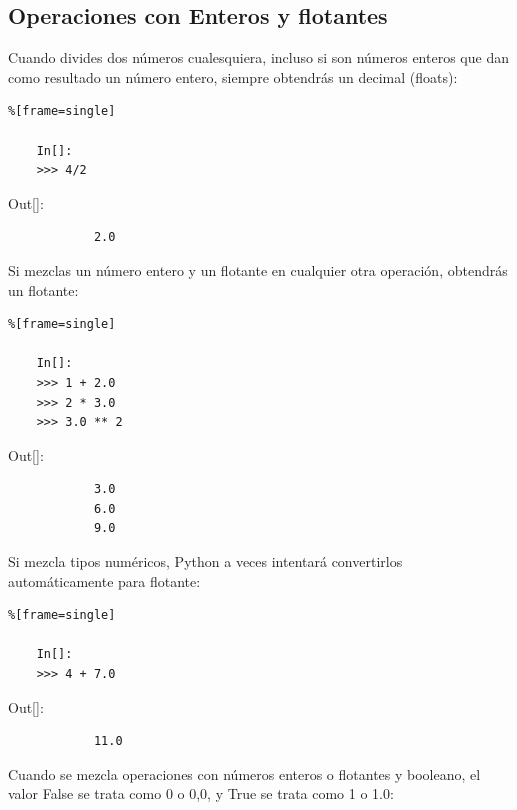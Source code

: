\subsection{Operaciones con Enteros y flotantes}

Cuando divides dos números cualesquiera, incluso si son números enteros que dan como resultado un
número entero, siempre obtendrás un decimal (floats):

\begin{lstlisting}%[frame=single]
	
	In[]:	
	>>> 4/2	
\end{lstlisting}

{\ttfamily\scriptsize\scriptsize 
	\hspace{-0.65cm}Out[]:\vspace{-0.15cm}	
	{\color{blue} 	
		
		\begin{verbatim}
			2.0
		\end{verbatim}
}}


Si mezclas un número entero y un flotante en cualquier otra operación, obtendrás un
flotante:

\begin{lstlisting}%[frame=single]
	
	In[]:	
	>>> 1 + 2.0
	>>> 2 * 3.0
	>>> 3.0 ** 2	
\end{lstlisting}

{\ttfamily\scriptsize\scriptsize 
	\hspace{-0.65cm}Out[]:\vspace{-0.15cm}	
	{\color{blue} 		
		\begin{verbatim}
			3.0
			6.0
			9.0
		\end{verbatim}
}}

Si mezcla tipos numéricos, Python a veces intentará convertirlos automáticamente para flotante:
\begin{lstlisting}%[frame=single]
	
	In[]:
	>>> 4 + 7.0
\end{lstlisting}

{\ttfamily\scriptsize\scriptsize 
	\hspace{-0.65cm}Out[]:\vspace{-0.15cm}	
	{\color{blue} 		
		\begin{verbatim}
			11.0
		\end{verbatim}
}}

Cuando se mezcla operaciones con números enteros o flotantes y  booleano, el valor False se trata como 0 o 0,0,  y 
True se trata como 1 o 1.0:

